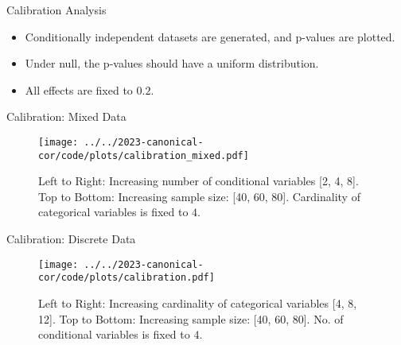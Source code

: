 \documentclass{beamer}
\begin{document}
\begin{frame}{Calibration Analysis}

\begin{center}
\end{center}

\begin{itemize}
	\item Conditionally independent datasets are generated, and p-values are plotted.
	\item Under null, the p-values should have a uniform distribution.
	\item All effects are fixed to $ 0.2 $.
\end{itemize}

\end{frame}

\begin{frame}{Calibration: Mixed Data}
	\begin{figure}[t]
		\centering
		\texttt{[image: ../../2023-canonical-cor/code/plots/calibration\_mixed.pdf]}
		\caption*{\footnotesize{Left to Right: Increasing number of conditional variables [2, 4, 8]. Top to Bottom: Increasing sample size: [40, 60, 80]. Cardinality of categorical variables is fixed to $ 4 $.}}
	\end{figure}
\end{frame}

\begin{frame}{Calibration: Discrete Data}
	\begin{figure}[t]
		\centering
		\texttt{[image: ../../2023-canonical-cor/code/plots/calibration.pdf]}
		\caption*{\footnotesize{Left to Right: Increasing cardinality of categorical variables [4, 8, 12]. Top to Bottom: Increasing sample size: [40, 60, 80]. No. of conditional variables is fixed to $ 4 $.}}
	\end{figure}
\end{frame}
\end{document}
